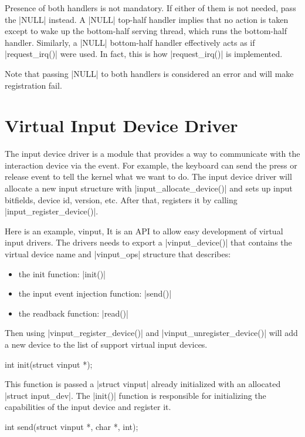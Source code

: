 \documentclass[10pt, oneside]{book}
\begin{document}
Presence of both handlers is not mandatory.
If either of them is not needed, pass the \cpp|NULL| instead.
A \cpp|NULL| top-half handler implies that no action is taken except to wake up the bottom-half serving thread, which runs the bottom-half handler.
Similarly, a \cpp|NULL| bottom-half handler effectively acts as if \cpp|request_irq()| were used.
In fact, this is how \cpp|request_irq()| is implemented.

Note that passing \cpp|NULL| to both handlers is considered an error and will make registration fail.

\section{Virtual Input Device Driver}
\label{sec:vinput}
The input device driver is a module that provides a way to communicate with the interaction device via the event.
For example, the keyboard can send the press or release event to tell the kernel what we want to do.
The input device driver will allocate a new input structure with \cpp|input_allocate_device()| and sets up input bitfields, device id, version, etc.
After that, registers it by calling \cpp|input_register_device()|.

Here is an example, vinput,
It is an API to allow easy development of virtual input drivers.
The drivers needs to export a \cpp|vinput_device()| that contains the virtual device name and \cpp|vinput_ops| structure that describes:

\begin{itemize}
    \item the init function: \cpp|init()|
    \item the input event injection function: \cpp|send()|
    \item the readback function: \cpp|read()|
\end{itemize}

Then using \cpp|vinput_register_device()| and \cpp|vinput_unregister_device()| will add a new device to the list of support virtual input devices.

\begin{code}
int init(struct vinput *);
\end{code}

This function is passed a \cpp|struct vinput| already initialized with an allocated \cpp|struct input_dev|.
The \cpp|init()| function is responsible for initializing the capabilities of the input device and register it.

\begin{code}
int send(struct vinput *, char *, int);
\end{code}
\end{document}
